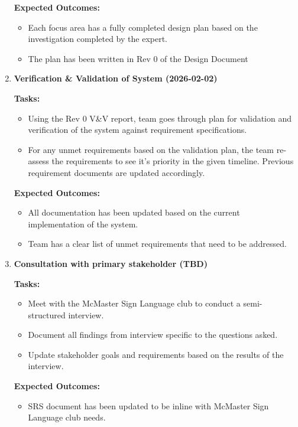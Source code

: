 \documentclass[12pt]{article}
\theoremstyle{definition}
\begin{document}
\begin{enumerate}
  \textbf{Expected Outcomes:}
  \begin{itemize}
      \item Each focus area has a fully completed design plan based on the 
      investigation completed by the expert. 
      \item The plan has been written in Rev 0 of the Design Document
  \end{itemize}

  \vspace{0.8em}

  \item \textbf{Verification \& Validation of System (2026-02-02)}  

  \textbf{Tasks:}
  \begin{itemize}
      \item Using the Rev 0 V\&V report, team goes through plan for validation 
      and verification of the system against
      requirement specifications. 
      \item For any unmet requirements based on the validation plan, the team 
      re-assess the requirements to see it's priority 
      in the given timeline. Previous requirement documents are updated 
      accordingly. 
  \end{itemize}

  \textbf{Expected Outcomes:}
  \begin{itemize}
      \item All documentation has been updated based on the current 
      implementation of the system. 
      \item Team has a clear list of unmet requirements that need to be 
      addressed. 
  \end{itemize}

  \vspace{0.8em}
  
  \item \textbf{Consultation with primary stakeholder (TBD)}    

  \textbf{Tasks:}
  \begin{itemize}
      \item Meet with the McMaster Sign Language club to conduct a
      semi-structured interview.
      \item Document all findings from interview specific to the questions
      asked. 
      \item Update stakeholder goals and requirements based on the results of 
      the interview. 
  \end{itemize}

  \textbf{Expected Outcomes:}
  \begin{itemize}
      \item SRS document has been updated to be inline with McMaster Sign 
      Language club needs. 
  \end{itemize}

  \vspace{0.8em}

\end{enumerate}
\end{document}
